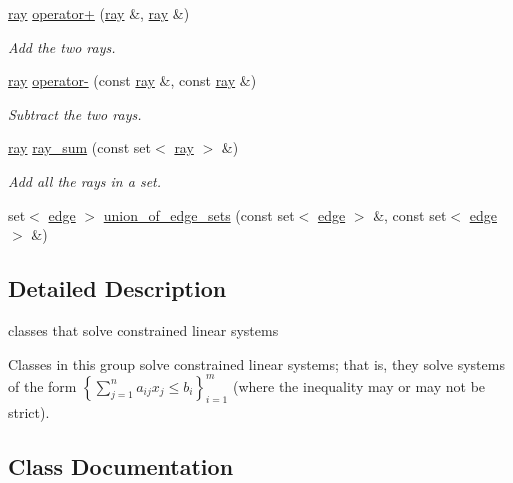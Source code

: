 \begin{DoxyCompactItemize}
\hyperlink{group___c_l_s_solvers_classray}{ray} \hyperlink{group___c_l_s_solvers_gaaa48bb668551858c8d53e230546042ba}{operator+} (\hyperlink{group___c_l_s_solvers_classray}{ray} \&, \hyperlink{group___c_l_s_solvers_classray}{ray} \&)
\begin{DoxyCompactList}\small\item\em Add the two rays. \end{DoxyCompactList}\item 
\hyperlink{group___c_l_s_solvers_classray}{ray} \hyperlink{group___c_l_s_solvers_gafcb092cfc55771c4303f540cb7697a40}{operator-\/} (const \hyperlink{group___c_l_s_solvers_classray}{ray} \&, const \hyperlink{group___c_l_s_solvers_classray}{ray} \&)
\begin{DoxyCompactList}\small\item\em Subtract the two rays. \end{DoxyCompactList}\item 
\hyperlink{group___c_l_s_solvers_classray}{ray} \hyperlink{group___c_l_s_solvers_gafb95c2b09dc0a5ea693a99cb8340ff28}{ray\+\_\+sum} (const set$<$ \hyperlink{group___c_l_s_solvers_classray}{ray} $>$ \&)
\begin{DoxyCompactList}\small\item\em Add all the rays in a set. \end{DoxyCompactList}\item 
set$<$ \hyperlink{group___c_l_s_solvers_classedge}{edge} $>$ \hyperlink{group___c_l_s_solvers_ga2b6dbec1643b53f8e613b0a3de07f3ce}{union\+\_\+of\+\_\+edge\+\_\+sets} (const set$<$ \hyperlink{group___c_l_s_solvers_classedge}{edge} $>$ \&, const set$<$ \hyperlink{group___c_l_s_solvers_classedge}{edge} $>$ \&)
\end{DoxyCompactItemize}


\subsection{Detailed Description}
classes that solve constrained linear systems 

Classes in this group solve constrained linear systems; that is, they solve systems of the form $\left\{\sum_{j=1}^na_{ij}x_j\leq b_i\right\}_{i=1}^m$ (where the inequality may or may not be strict). 

\subsection{Class Documentation}
\label{classconstraint}
